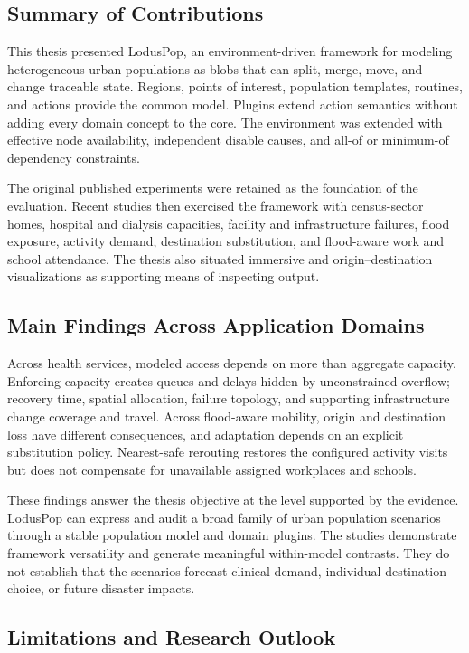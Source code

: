 \documentclass[pdflatex,sn-mathphys-num]{sn-jnl}%
\theoremstyle{thmstyleone}%
\theoremstyle{thmstyletwo}%
\theoremstyle{thmstylethree}%
\begin{document}
\subsection{Summary of Contributions}

This thesis presented LodusPop, an environment-driven framework for modeling heterogeneous urban populations as blobs that can split, merge, move, and change traceable state. Regions, points of interest, population templates, routines, and actions provide the common model. Plugins extend action semantics without adding every domain concept to the core. The environment was extended with effective node availability, independent disable causes, and all-of or minimum-of dependency constraints.

The original published experiments were retained as the foundation of the evaluation. Recent studies then exercised the framework with census-sector homes, hospital and dialysis capacities, facility and infrastructure failures, flood exposure, activity demand, destination substitution, and flood-aware work and school attendance. The thesis also situated immersive and origin--destination visualizations as supporting means of inspecting output.

\subsection{Main Findings Across Application Domains}

Across health services, modeled access depends on more than aggregate capacity. Enforcing capacity creates queues and delays hidden by unconstrained overflow; recovery time, spatial allocation, failure topology, and supporting infrastructure change coverage and travel. Across flood-aware mobility, origin and destination loss have different consequences, and adaptation depends on an explicit substitution policy. Nearest-safe rerouting restores the configured activity visits but does not compensate for unavailable assigned workplaces and schools.

These findings answer the thesis objective at the level supported by the evidence. LodusPop can express and audit a broad family of urban population scenarios through a stable population model and domain plugins. The studies demonstrate framework versatility and generate meaningful within-model contrasts. They do not establish that the scenarios forecast clinical demand, individual destination choice, or future disaster impacts.

\subsection{Limitations and Research Outlook}
\end{document}
